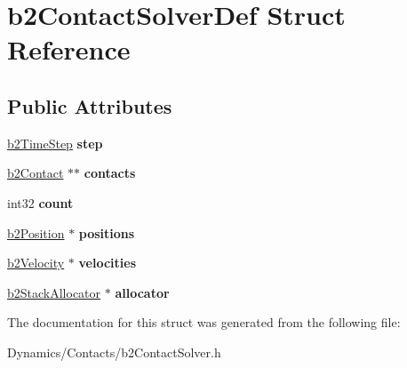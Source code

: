 \hypertarget{structb2ContactSolverDef}{}\section{b2\+Contact\+Solver\+Def Struct Reference}
\label{structb2ContactSolverDef}
\subsection*{Public Attributes}
\begin{DoxyCompactItemize}
\item 
\mbox{\label{structb2ContactSolverDef_a544604c01e6606ab54b8ccd5289a7ac7}} 
\mbox{\hyperlink{structb2TimeStep}{b2\+Time\+Step}} {\bfseries step}
\item 
\mbox{\label{structb2ContactSolverDef_a4b9d708e3122cab8d9dabeafefc7a9af}} 
\mbox{\hyperlink{classb2Contact}{b2\+Contact}} $\ast$$\ast$ {\bfseries contacts}
\item 
\mbox{\label{structb2ContactSolverDef_ae977ea1cee4b7b9ee99210d9b66f88ea}} 
int32 {\bfseries count}
\item 
\mbox{\label{structb2ContactSolverDef_aaf1432d040aa6279d91d8c9f24a4728a}} 
\mbox{\hyperlink{structb2Position}{b2\+Position}} $\ast$ {\bfseries positions}
\item 
\mbox{\label{structb2ContactSolverDef_ae839e5c5464aa54c1ad8ce1634b49a1f}} 
\mbox{\hyperlink{structb2Velocity}{b2\+Velocity}} $\ast$ {\bfseries velocities}
\item 
\mbox{\label{structb2ContactSolverDef_a54198ac9886a988b9ffd06cf28c4c45c}} 
\mbox{\hyperlink{classb2StackAllocator}{b2\+Stack\+Allocator}} $\ast$ {\bfseries allocator}
\end{DoxyCompactItemize}


The documentation for this struct was generated from the following file\+:\begin{DoxyCompactItemize}
\item 
Dynamics/\+Contacts/b2\+Contact\+Solver.\+h\end{DoxyCompactItemize}
